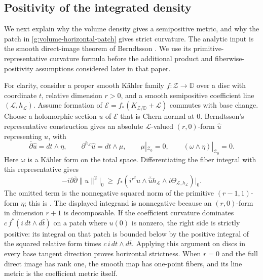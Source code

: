 \subsection{Positivity of the integrated density}

We next explain why the volume density gives a semipositive metric,
and why the patch in \eqref{g:volume-horizontal-patch} gives strict
curvature.  The analytic input is the smooth direct-image theorem
of Berndtsson \cite[Theorem~1.2]{Berndtsson2009}.  We use its
primitive-representative curvature formula before the additional
product and fiberwise-positivity assumptions considered later in that
paper.

For clarity, consider a proper smooth K\"ahler family
$f:\mathcal Z\to\mathbb D$ over a disc with coordinate $t$,
relative dimension $r>0$, and a smooth semipositive
coefficient line $(\mathcal L,h_{\mathcal L})$.  Assume formation of
$\mathcal E=f_*(K_{\mathcal Z/\mathbb D}+\mathcal L)$ commutes with
base change.  Choose a holomorphic section $u$ of $\mathcal E$
that is Chern-normal at $0$.  Berndtsson's representative construction
\cite[Proposition~4.2]{Berndtsson2009} gives an absolute
$\mathcal L$-valued $(r,0)$-form $\widehat u$ representing $u$, with
\[
 \bar\partial\widehat u=dt\wedge\eta,\qquad
 \partial^{h_{\mathcal L}}\widehat u=dt\wedge\mu,
 \qquad \mu|_{\mathcal Z_0}=0,
 \qquad (\omega\wedge\eta)|_{\mathcal Z_0}=0.
\]
Here $\omega$ is a K\"ahler form on the total space.  Differentiating
the fiber integral with this representative gives
\begin{equation}\label{g:volume-curvature-bound}
 -i\partial\bar\partial\|u\|^2\big|_0
 \ \geq\
 f_*\!\left(i^{r^2}\widehat u\wedge\overline{\widehat u}
       h_{\mathcal L}\wedge i\Theta_{\mathcal L,h_{\mathcal L}}\right)
       \big|_0.
\end{equation}
The omitted term is the nonnegative squared norm of the primitive
$(r-1,1)$-form $\eta$; this is
\cite[formula~(4.8)]{Berndtsson2009}.
The displayed integrand is nonnegative because an $(r,0)$-form in
dimension $r+1$ is decomposable.  If the coefficient curvature
dominates $c\,f^*(i\,dt\wedge d\bar t)$ on a patch where $u(0)$
is nonzero, the right side is strictly positive: its integral on that
patch is bounded below by the positive integral of the squared
relative form times $c\,i\,dt\wedge d\bar t$.
Applying this argument on discs in every base tangent direction proves
horizontal strictness.  When $r=0$ and the full direct image has rank
one, the smooth map has one-point fibers, and its line metric is the
coefficient metric itself.

